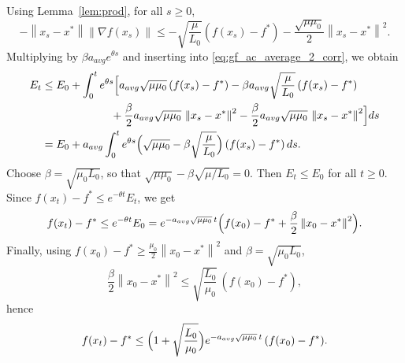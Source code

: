\documentclass{article}
\newcommand{\bpar}[1]{\left(#1\right)}
\newcommand{\norm}[1]{\left\lVert#1\right\rVert}
\theoremstyle{plain}
\theoremstyle{definition}
\theoremstyle{remark}
\begin{document}
Using Lemma~\ref{lem:prod}, for all $s\ge 0$,
\[
-\norm{x_s-x^\ast}\norm{\nabla f(x_s)}
\le -\sqrt{\frac{\mu}{L_0}}(f(x_s)-f^\ast) - \frac{\sqrt{\mu \mu_0}}{2}\norm{x_s-x^\ast}^2.
\]
Multiplying by $\beta a_{avg}e^{\theta s}$ and inserting into \eqref{eq:gf_ac_average_2_corr}, we obtain
\begin{align*}
E_t
&\le E_0 + \int_0^t e^{\theta s}\Bigl[
a_{avg}\sqrt{\mu\mu_0}\,(f(x_s)-f^\ast)
- \beta a_{avg}\sqrt{\frac{\mu}{L_0}}\,(f(x_s)-f^\ast)\\
&\hspace{2.2cm}
+ \frac{\beta}{2}a_{avg}\sqrt{\mu\mu_0}\,\norm{x_s-x^\ast}^2
- \frac{\beta}{2}a_{avg}\sqrt{\mu\mu_0}\,\norm{x_s-x^\ast}^2
\Bigr]ds\\
&= E_0 + a_{avg}\int_0^t e^{\theta s}
\Bigl(\sqrt{\mu\mu_0}-\beta\sqrt{\frac{\mu}{L_0}}\Bigr)\,(f(x_s)-f^\ast)\,ds.
\end{align*}
Choose $\beta=\sqrt{\mu_0L_0}$, so that
$\sqrt{\mu\mu_0}-\beta\sqrt{\mu/L_0}=0$. Then $E_t\le E_0$ for all $t\ge 0$.
Since $f(x_t)-f^\ast \le e^{-\theta t}E_t$, we get
\[
f(x_t)-f^\ast \le e^{-\theta t}E_0
= e^{-a_{avg}\sqrt{\mu\mu_0}\,t}\Bigl(f(x_0)-f^\ast + \frac{\beta}{2}\norm{x_0-x^\ast}^2\Bigr).
\]
Finally, using $f(x_0)-f^\ast \ge \frac{\mu_0}{2}\norm{x_0-x^\ast}^2$ and $\beta=\sqrt{\mu_0L_0}$,
\[
\frac{\beta}{2}\norm{x_0-x^\ast}^2
\le \sqrt{\frac{L_0}{\mu_0}}\,(f(x_0)-f^\ast),
\]
hence
\[
f(x_t)-f^\ast \le \Bigl(1+\sqrt{\frac{L_0}{\mu_0}}\Bigr)e^{-a_{avg}\sqrt{\mu\mu_0}\,t}\,(f(x_0)-f^\ast).
\]




\end{document}
